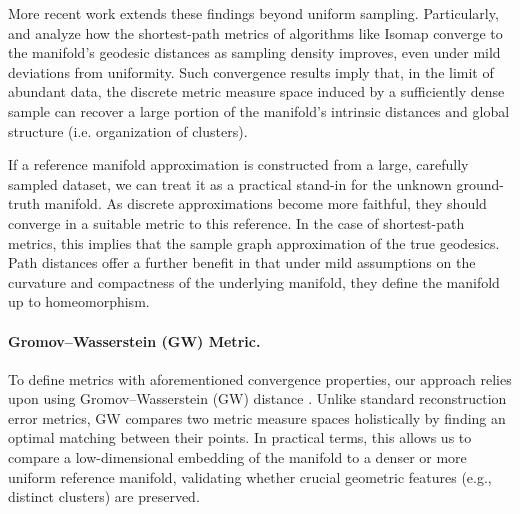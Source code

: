 \documentclass{article}
\theoremstyle{plain}
\theoremstyle{definition}
\theoremstyle{remark}
\begin{document}
More recent work extends these findings beyond uniform sampling. Particularly, \citet{soberApproximatingRiemannianMetric2020} and \citet{trossetRehabilitatingIsomapEuclidean2021} analyze how the shortest-path metrics of algorithms like Isomap converge to the manifold’s geodesic distances as sampling density improves, even under mild deviations from uniformity. Such convergence results imply that, in the limit of abundant data, the discrete metric measure space induced by a sufficiently dense sample can recover a large portion of the manifold’s intrinsic distances and global structure (i.e. organization of clusters).

If a reference manifold approximation is constructed from a large, carefully sampled dataset, we can treat it as a practical stand-in for the unknown ground-truth manifold. As discrete approximations become more faithful, they should converge in a suitable metric to this reference. In the case of shortest-path metrics, this implies that the sample graph approximation of the true geodesics. Path distances offer a further benefit in that under mild assumptions on the curvature and compactness of the underlying manifold, they define the manifold up to homeomorphism. \cite{Nik83}


\paragraph{Gromov--Wasserstein (GW) Metric.}
To define metrics with aforementioned convergence properties, our approach relies upon using Gromov--Wasserstein (GW) distance \citet{memoliGromovWassersteinDistances2011}. Unlike standard reconstruction error metrics, GW compares two metric measure spaces holistically by finding an optimal matching between their points. In practical terms, this allows us to compare a low-dimensional embedding of the manifold to a denser or more uniform reference manifold, validating whether crucial geometric features (e.g., distinct clusters) are preserved.
\end{document}
